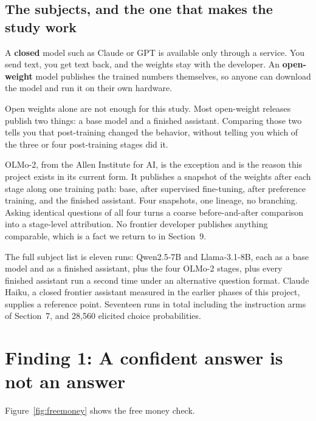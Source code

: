 \documentclass[11pt]{article}
\newcommand{\term}[1]{\textbf{\color{purpledk}#1}}
\begin{document}
\subsection{The subjects, and the one that makes the study work}

\begin{keybox}
A \term{closed} model such as Claude or GPT is available only through a service. You send text,
you get text back, and the weights stay with the developer. An \term{open-weight} model publishes
the trained numbers themselves, so anyone can download the model and run it on their own
hardware.

Open weights alone are not enough for this study. Most open-weight releases publish two things: a
base model and a finished assistant. Comparing those two tells you that post-training changed the
behavior, without telling you which of the three or four post-training stages did it.

OLMo-2, from the Allen Institute for AI, is the exception and is the reason this project exists in
its current form. It publishes a snapshot of the weights after each stage along one training
path: base, after supervised fine-tuning, after preference training, and the finished assistant.
Four snapshots, one lineage, no branching. Asking identical questions of all four turns a coarse
before-and-after comparison into a stage-level attribution. No frontier developer publishes
anything comparable, which is a fact we return to in Section~9.
\end{keybox}

The full subject list is eleven runs: Qwen2.5-7B and Llama-3.1-8B, each as a base model and as a
finished assistant, plus the four OLMo-2 stages, plus every finished assistant run a second time
under an alternative question format. Claude Haiku, a closed frontier assistant measured in the
earlier phases of this project, supplies a reference point. Seventeen runs in total including the
instruction arms of Section~7, and 28{,}560 elicited choice probabilities.

\section{Finding 1: A confident answer is not an answer}

Figure~\ref{fig:freemoney} shows the free money check.
\end{document}
